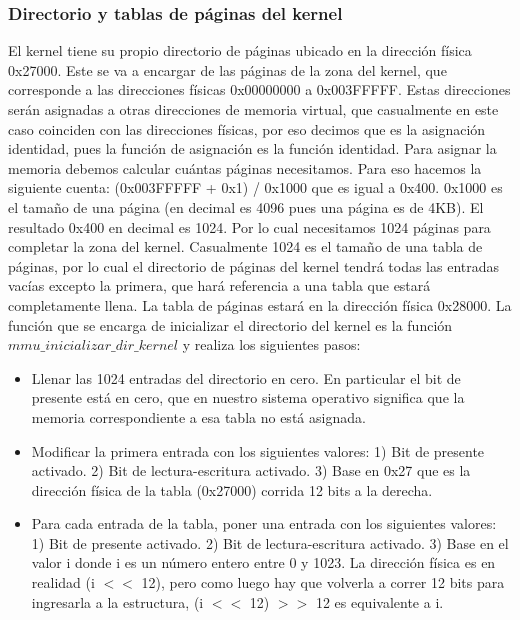 \subsubsection{Directorio y tablas de páginas del kernel}
El kernel tiene su propio directorio de páginas ubicado en la dirección física 0x27000. Este se va a encargar de las páginas de la zona del kernel, que corresponde a las direcciones físicas 0x00000000 a 0x003FFFFF. Estas direcciones serán asignadas a otras direcciones de memoria virtual, que casualmente en este caso coinciden con las direcciones físicas, por eso decimos que es la asignación identidad, pues la función de asignación es la función identidad.\newline
Para asignar la memoria debemos calcular cuántas páginas necesitamos. Para eso hacemos la siguiente cuenta: (0x003FFFFF + 0x1) / 0x1000 que es igual a 0x400. 0x1000 es el tamaño de una página (en decimal es 4096 pues una página es de 4KB). El resultado 0x400 en decimal es 1024. Por lo cual necesitamos 1024 páginas para completar la zona del kernel. Casualmente 1024 es el tamaño de una tabla de páginas, por lo cual el directorio de páginas del kernel tendrá todas las entradas vacías excepto la primera, que hará referencia a una tabla que estará completamente llena. La tabla de páginas estará en la dirección física 0x28000.\newline
La función que se encarga de inicializar el directorio del kernel es la función $mmu\_inicializar\_dir\_kernel$ y realiza los siguientes pasos:
\begin{itemize}
\item Llenar las 1024 entradas del directorio en cero. En particular el bit de presente está en cero, que en nuestro sistema operativo significa que la memoria correspondiente a esa tabla no está asignada.
\item Modificar la primera entrada con los siguientes valores: 1) Bit de presente activado. 2) Bit de lectura-escritura activado. 3) Base en 0x27 que es la dirección física de la tabla (0x27000) corrida 12 bits a la derecha.
\item Para cada entrada de la tabla, poner una entrada con los siguientes valores: 1) Bit de presente activado. 2) Bit de lectura-escritura activado. 3) Base en el valor i donde i es un número entero entre 0 y 1023. La dirección física es en realidad (i $<<$ 12), pero como luego hay que volverla a correr 12 bits para ingresarla a la estructura, (i $<<$ 12) $>>$ 12 es equivalente a i.
\end{itemize}


